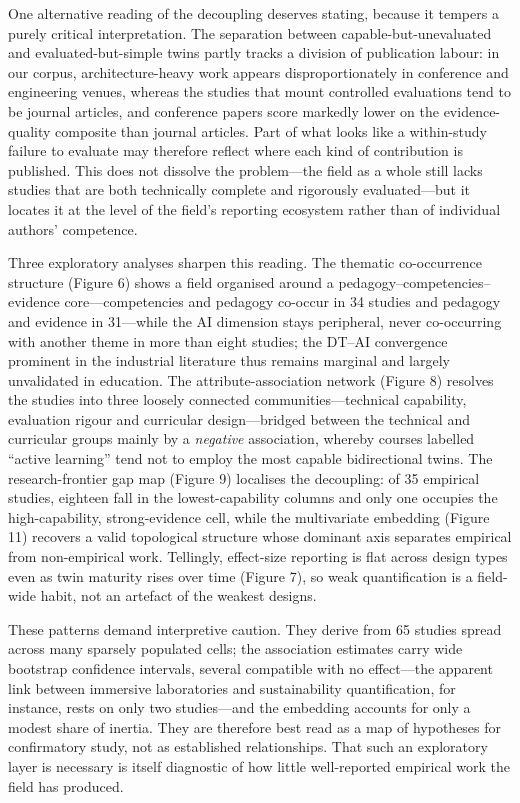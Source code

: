 One alternative reading of the decoupling deserves stating, because it tempers a
purely critical interpretation. The separation between capable-but-unevaluated and
evaluated-but-simple twins partly tracks a division of publication labour: in our
corpus, architecture-heavy work appears disproportionately in conference and
engineering venues, whereas the studies that mount controlled evaluations tend to
be journal articles, and conference papers score markedly lower on the
evidence-quality composite than journal articles. Part of what looks like a
within-study failure to evaluate may therefore reflect where each kind of
contribution is published. This does not dissolve the problem---the field as a whole
still lacks studies that are both technically complete and rigorously
evaluated---but it locates it at the level of the field's reporting ecosystem rather
than of individual authors' competence.

Three exploratory analyses sharpen this reading. The thematic co-occurrence
structure (Figure 6) shows a field organised around a pedagogy--competencies--
evidence core---competencies and pedagogy co-occur in 34 studies and pedagogy and
evidence in 31---while the AI dimension stays peripheral, never co-occurring with
another theme in more than eight studies; the DT--AI convergence prominent in the
industrial literature \citep{chen_ai-enhanced_2025, liu_cognitive_2025} thus remains marginal
and largely unvalidated in education. The
attribute-association network (Figure 8) resolves the studies into three loosely
connected communities---technical capability, evaluation rigour and curricular
design---bridged between the technical and curricular groups mainly by a \emph{negative}
association, whereby courses labelled ``active learning'' tend not to employ the
most capable bidirectional twins. The research-frontier gap map (Figure 9)
localises the decoupling: of 35 empirical studies, eighteen fall in the lowest-capability
columns and only one occupies the high-capability, strong-evidence cell, while the
multivariate embedding (Figure 11) recovers a valid topological structure whose
dominant axis separates empirical from non-empirical work. Tellingly, effect-size
reporting is flat across design types even as twin maturity rises over time
(Figure 7), so weak quantification is a field-wide habit, not an artefact
of the weakest designs.

These patterns demand interpretive caution. They derive from 65 studies spread
across many sparsely populated cells; the association estimates carry wide
bootstrap confidence intervals, several compatible with no effect---the apparent
link between immersive laboratories and sustainability quantification, for
instance, rests on only two studies---and the embedding accounts for only a modest
share of inertia. They are therefore best read as a map of hypotheses for
confirmatory study, not as established relationships. That such an exploratory
layer is necessary is itself diagnostic of how little well-reported empirical work
the field has produced.

